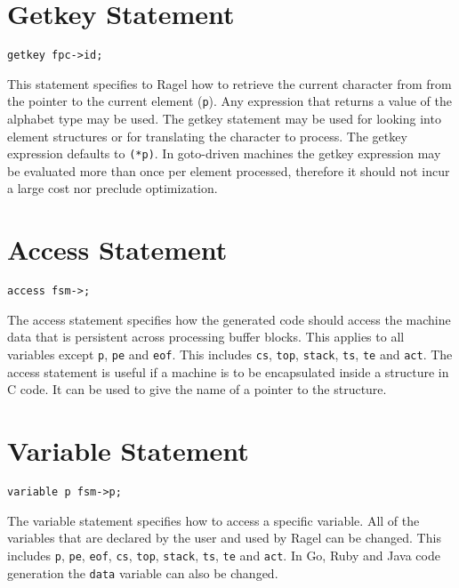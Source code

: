 \documentclass[letterpaper,11pt,oneside]{book}
\newcommand{\verbspace}{\vspace{10pt}}
\begin{document}
\section{Getkey Statement}

\begin{verbatim}
getkey fpc->id;
\end{verbatim}
\verbspace

This statement specifies to Ragel how to retrieve the current character from 
from the pointer to the current element (\verb|p|). Any expression that returns
a value of the alphabet type
may be used. The getkey statement may be used for looking into element
structures or for translating the character to process. The getkey expression
defaults to \verb|(*p)|. In goto-driven machines the getkey expression may be
evaluated more than once per element processed, therefore it should not incur a
large cost nor preclude optimization.

\section{Access Statement}

\begin{verbatim}
access fsm->;
\end{verbatim}
\verbspace

The access statement specifies how the generated code should
access the machine data that is persistent across processing buffer blocks.
This applies to all variables except \verb|p|, \verb|pe| and \verb|eof|. This includes
\verb|cs|, \verb|top|, \verb|stack|, \verb|ts|, \verb|te| and \verb|act|.
The access statement is useful if a machine is to be encapsulated inside a
structure in C code. It can be used to give the name of
a pointer to the structure.

\section{Variable Statement}

\begin{verbatim}
variable p fsm->p;
\end{verbatim}
\verbspace

The variable statement specifies how to access a specific
variable. All of the variables that are declared by the user and
used by Ragel can be changed. This includes \verb|p|, \verb|pe|, \verb|eof|, \verb|cs|,
\verb|top|, \verb|stack|, \verb|ts|, \verb|te| and \verb|act|.
In Go, Ruby and Java code generation the \verb|data| variable can also be changed.
\end{document}
